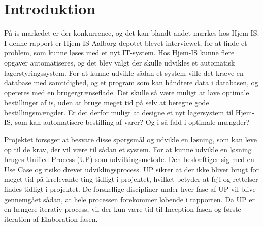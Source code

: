 \chapter{Introduktion}\label{ch:introduction}
På is-markedet er der konkurrence, og det kan blandt andet mærkes hos Hjem-IS. I denne rapport er Hjem-IS Aalborg depotet blevet interviewet, for at finde et problem, som kunne løses med et nyt IT-system.  
Hos Hjem-IS kunne flere opgaver automatiseres, og det blev valgt der skulle udvikles et automatisk lagerstyringssystem. For at kunne udvikle sådan et system ville det kræve en database med samtidighed, og et program som kan håndtere data i databasen, og opereres med en brugergrænseflade. 
Det skulle så være muligt at lave optimale bestillinger af is, uden at bruge meget tid på selv at beregne gode bestillingsmængder. Er det derfor muligt at designe et nyt lagersystem til Hjem-IS, som kan automatisere bestilling af varer? Og i så fald i optimale mængder? 

Projektet forsøger at besvare disse spørgsmål og udvikle en løsning, som kan leve op til de krav, der vil være til sådan et system. For at kunne udvikle en løsning bruges Unified Process (UP)\cite{UnifiedProcess} som udvilkingsmetode. Den beskæftiger sig med en Use Case og risiko drevet udviklingsprocess. UP sikrer at der ikke bliver brugt for meget tid på irrelevante ting tidligt i projektet, hvilket betyder at fejl og rettelser findes tidligt i projektet. De forskellige discipliner under hver fase af UP vil blive gennemgået sådan, at hele processen forekommer løbende i rapporten. Da UP er en længere iterativ process, vil der kun være tid til Inception fasen og første iteration af Elaboration fasen\cite{UnifiedProcess}.